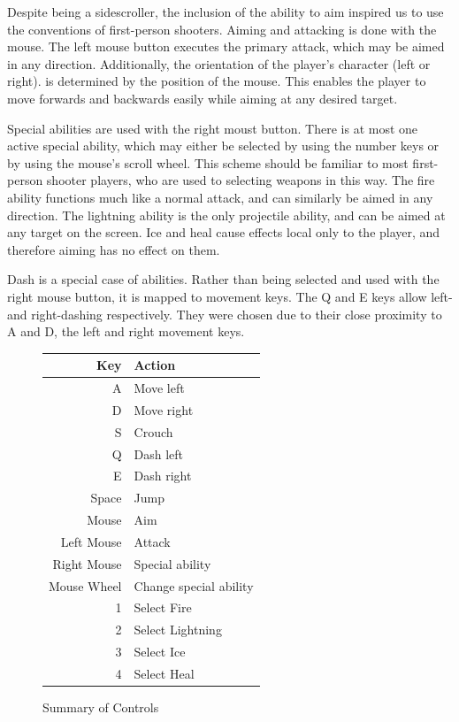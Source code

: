 \documentclass{article}
\begin{document}
Despite being a sidescroller, the inclusion of the ability to aim inspired us to use the conventions of first-person shooters.  Aiming and attacking is done with the mouse.  The left mouse button executes the primary attack, which may be aimed in any direction.  Additionally, the orientation of the player's character (left or right).  is determined by the position of the mouse.  This enables the player to move forwards and backwards easily while aiming at any desired target.

Special abilities are used with the right moust button.  There is at most one active special ability, which may either be selected by using the number keys or by using the mouse's scroll wheel.  This scheme should be familiar to most first-person shooter players, who are used to selecting weapons in this way.  The fire ability functions much like a normal attack, and can similarly be aimed in any direction.  The lightning ability is the only projectile ability, and can be aimed at any target on the screen.  Ice and heal cause effects local only to the player, and therefore aiming has no effect on them.

Dash is a special case of abilities.  Rather than being selected and used with the right mouse button, it is mapped to movement keys.  The Q and E keys allow left- and right-dashing respectively.  They were chosen due to their close proximity to A and D, the left and right movement keys.

\begin{figure}[h!]
\begin{tabular}{|r|l|}
\hline
Key & Action \\
\hline
A & Move left \\
D & Move right \\
S & Crouch \\
Q & Dash left \\
E & Dash right \\
Space & Jump \\
Mouse & Aim \\
Left Mouse & Attack \\
Right Mouse & Special ability \\
Mouse Wheel & Change special ability \\
1 & Select Fire \\
2 & Select Lightning \\
3 & Select Ice \\
4 & Select Heal \\
\hline
\end{tabular}
\caption{Summary of Controls}
\label{ControlsTable}
\end{figure}
\end{document}
